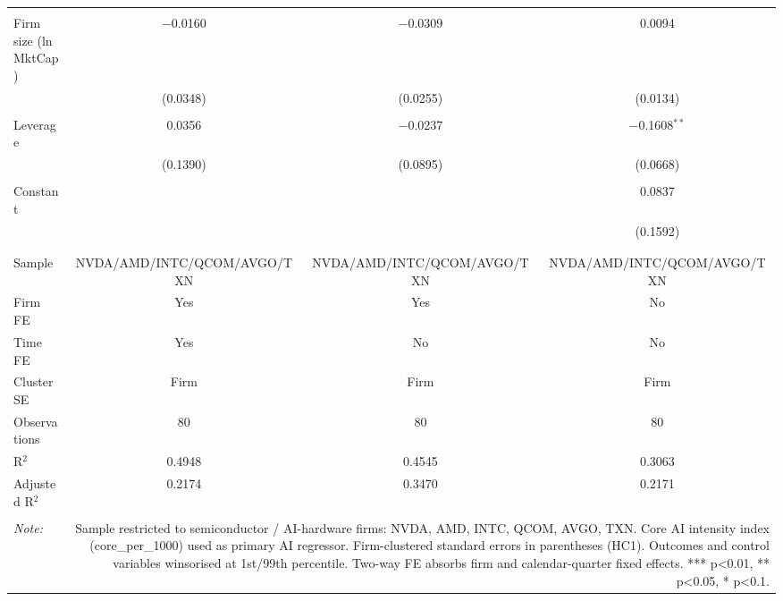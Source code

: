 \begin{table}[!htbp]
\begin{tabular}{@{\extracolsep{5pt}}lccc}
  & & & \\ 
 Firm size (ln MktCap) & $-$0.0160 & $-$0.0309 & 0.0094 \\ 
  & (0.0348) & (0.0255) & (0.0134) \\ 
  & & & \\ 
 Leverage & 0.0356 & $-$0.0237 & $-$0.1608$^{**}$ \\ 
  & (0.1390) & (0.0895) & (0.0668) \\ 
  & & & \\ 
 Constant &  &  & 0.0837 \\ 
  &  &  & (0.1592) \\ 
  & & & \\ 
\hline \\[-1.8ex] 
Sample & NVDA/AMD/INTC/QCOM/AVGO/TXN & NVDA/AMD/INTC/QCOM/AVGO/TXN & NVDA/AMD/INTC/QCOM/AVGO/TXN \\ 
Firm FE & Yes & Yes & No \\ 
Time FE & Yes & No & No \\ 
Cluster SE & Firm & Firm & Firm \\ 
Observations & 80 & 80 & 80 \\ 
R$^{2}$ & 0.4948 & 0.4545 & 0.3063 \\ 
Adjusted R$^{2}$ & 0.2174 & 0.3470 & 0.2171 \\ 
\hline 
\hline \\[-1.8ex] 
\textit{Note:}  & \multicolumn{3}{r}{Sample restricted to semiconductor / AI-hardware firms: NVDA, AMD, INTC, QCOM, AVGO, TXN. Core AI intensity index (core_per_1000) used as primary AI regressor. Firm-clustered standard errors in parentheses (HC1). Outcomes and control variables winsorised at 1st/99th percentile. Two-way FE absorbs firm and calendar-quarter fixed effects. *** p<0.01, ** p<0.05, * p<0.1.} \\ 
\end{tabular} 
\end{table} 
